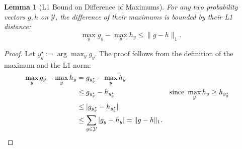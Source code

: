 \documentclass{article}
\theoremstyle{plain}
\newtheorem{lemma}[theorem]{Lemma}
\begin{document}
\begin{lemma}[L1 Bound on Difference of Maximums]
\label{lem:max-diff-l1}
For any two probability vectors $g, h$ on $\mathcal{Y}$, the difference of their maximums is bounded by their L1 distance:
\[
\max_{y} g_y - \max_{y} h_y \le \|g-h\|_1.
\]
\end{lemma}
\begin{proof}
Let $y_g^\star := \arg\max_y g_y$. The proof follows from the definition of the maximum and the L1 norm:
\begin{align*}
\max_{y} g_y - \max_{y} h_y &= g_{y_g^\star} - \max_{y} h_y \\
&\le g_{y_g^\star} - h_{y_g^\star} && \text{since } \max_{y} h_y \ge h_{y_g^\star} \\
&\le |g_{y_g^\star} - h_{y_g^\star}| && \\
&\le \sum_{y \in \mathcal{Y}} |g_y - h_y| = \|g-h\|_1. && \qedhere
\end{align*}
\end{proof}
\end{document}

